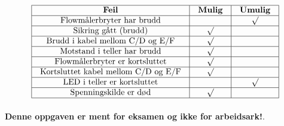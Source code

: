 $$\vbox{\offinterlineskip
\halign{\strut
\vrule \quad\hfil # \ \hfil & 
\vrule \quad\hfil # \ \hfil & 
\vrule \quad\hfil # \ \hfil \vrule \cr
\noalign{\hrule}
%
{\bf Feil} & {\bf Mulig} & {\bf Umulig} \cr
%
\noalign{\hrule}
%
Flowmålerbryter har brudd &  & $\surd$ \cr
%
\noalign{\hrule}
%
Sikring gått (brudd) & $\surd$ &  \cr
%
\noalign{\hrule}
%
Brudd i kabel mellom C/D og E/F & $\surd$ &  \cr
%
\noalign{\hrule}
%
Motstand i teller har brudd & $\surd$ &  \cr
%
\noalign{\hrule}
%
Flowmålerbryter er kortsluttet & $\surd$ &  \cr
%
\noalign{\hrule}
%
Kortsluttet kabel mellom C/D og E/F & $\surd$ &  \cr
%
\noalign{\hrule}
%
LED i teller er kortsluttet &  & $\surd$ \cr
%
\noalign{\hrule}
%
Spenningskilde er død & $\surd$ &  \cr
%
\noalign{\hrule}
} %
}$$ %








{\bf Denne oppgaven er ment for eksamen og ikke for arbeidsark!}.

